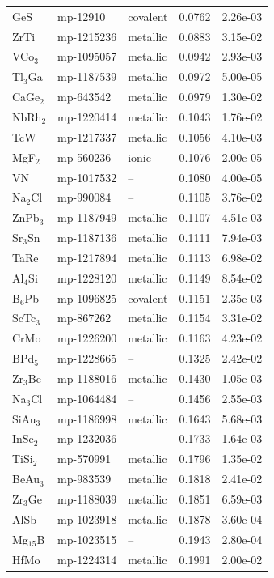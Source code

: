 \begin{longtable}{@{}l l l r r@{}}
GeS & mp-12910 & covalent & 0.0762 & 2.26e-03 \\
ZrTi & mp-1215236 & metallic & 0.0883 & 3.15e-02 \\
VCo$_{3}$ & mp-1095057 & metallic & 0.0942 & 2.93e-03 \\
Tl$_{3}$Ga & mp-1187539 & metallic & 0.0972 & 5.00e-05 \\
CaGe$_{2}$ & mp-643542 & metallic & 0.0979 & 1.30e-02 \\
NbRh$_{2}$ & mp-1220414 & metallic & 0.1043 & 1.76e-02 \\
TcW & mp-1217337 & metallic & 0.1056 & 4.10e-03 \\
MgF$_{2}$ & mp-560236 & ionic & 0.1076 & 2.00e-05 \\
VN & mp-1017532 & -- & 0.1080 & 4.00e-05 \\
Na$_{2}$Cl & mp-990084 & -- & 0.1105 & 3.76e-02 \\
ZnPb$_{3}$ & mp-1187949 & metallic & 0.1107 & 4.51e-03 \\
Sr$_{3}$Sn & mp-1187136 & metallic & 0.1111 & 7.94e-03 \\
TaRe & mp-1217894 & metallic & 0.1113 & 6.98e-02 \\
Al$_{4}$Si & mp-1228120 & metallic & 0.1149 & 8.54e-02 \\
B$_{6}$Pb & mp-1096825 & covalent & 0.1151 & 2.35e-03 \\
ScTc$_{3}$ & mp-867262 & metallic & 0.1154 & 3.31e-02 \\
CrMo & mp-1226200 & metallic & 0.1163 & 4.23e-02 \\
BPd$_{5}$ & mp-1228665 & -- & 0.1325 & 2.42e-02 \\
Zr$_{3}$Be & mp-1188016 & metallic & 0.1430 & 1.05e-03 \\
Na$_{3}$Cl & mp-1064484 & -- & 0.1456 & 2.55e-03 \\
SiAu$_{3}$ & mp-1186998 & metallic & 0.1643 & 5.68e-03 \\
InSe$_{2}$ & mp-1232036 & -- & 0.1733 & 1.64e-03 \\
TiSi$_{2}$ & mp-570991 & metallic & 0.1796 & 1.35e-02 \\
BeAu$_{3}$ & mp-983539 & metallic & 0.1818 & 2.41e-02 \\
Zr$_{3}$Ge & mp-1188039 & metallic & 0.1851 & 6.59e-03 \\
AlSb & mp-1023918 & metallic & 0.1878 & 3.60e-04 \\
Mg$_{15}$B & mp-1023515 & -- & 0.1943 & 2.80e-04 \\
HfMo & mp-1224314 & metallic & 0.1991 & 2.00e-02 \\
\midrule
\end{longtable}